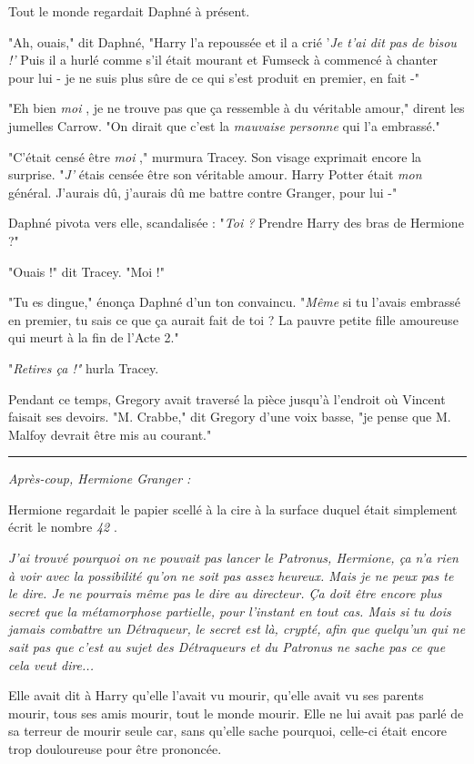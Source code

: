Tout le monde regardait Daphné à présent.

"Ah, ouais," dit Daphné, "Harry l'a repoussée et il a crié '\emph{Je t'ai dit pas de bisou !' } Puis il a hurlé comme s'il était mourant et Fumseck à commencé à chanter pour lui - je ne suis plus sûre de ce qui s'est produit en premier, en fait -"

"Eh bien \emph{moi} , je ne trouve pas que ça ressemble à du véritable amour," dirent les jumelles Carrow. "On dirait que c'est la \emph{mauvaise personne } qui l'a embrassé."

"C'était censé être \emph{moi} ," murmura Tracey. Son visage exprimait encore la surprise. "\emph{J'} étais censée être son véritable amour. Harry Potter était \emph{mon}  général. J'aurais dû, j'aurais dû me battre contre Granger, pour lui -"

Daphné pivota vers elle, scandalisée : "\emph{Toi ? } Prendre Harry des bras de Hermione ?"

"Ouais !" dit Tracey. "Moi !"

"Tu es dingue," énonça Daphné d'un ton convaincu. "\emph{Même}  si tu l'avais embrassé en premier, tu sais ce que ça aurait fait de toi ? La pauvre petite fille amoureuse qui meurt à la fin de l'Acte 2."

"\emph{Retires ça !"}  hurla Tracey.

Pendant ce temps, Gregory avait traversé la pièce jusqu'à l'endroit où Vincent faisait ses devoirs. "M. Crabbe," dit Gregory d'une voix basse, "je pense que M. Malfoy devrait être mis au courant."
\par\noindent\rule{\textwidth}{0.4pt}
\emph{Après-coup, Hermione Granger :} 

Hermione regardait le papier scellé à la cire à la surface duquel était simplement écrit le nombre \emph{42} .

\emph{J'ai trouvé pourquoi on ne pouvait pas lancer le Patronus, Hermione, ça n'a rien à voir avec la possibilité qu'on ne soit pas assez heureux. Mais je ne peux pas te le dire. Je ne pourrais même pas le dire au directeur. Ça doit être encore plus secret que la métamorphose partielle, pour l'instant en tout cas. Mais si tu dois jamais combattre un Détraqueur, le secret est là, crypté, afin que quelqu'un qui ne sait pas que c'est au sujet des Détraqueurs et du Patronus ne sache pas ce que cela veut dire...} 

Elle avait dit à Harry qu'elle l'avait vu mourir, qu'elle avait vu ses parents mourir, tous ses amis mourir, tout le monde mourir. Elle ne lui avait pas parlé de sa terreur de mourir seule car, sans qu'elle sache pourquoi, celle-ci était encore trop douloureuse pour être prononcée.

